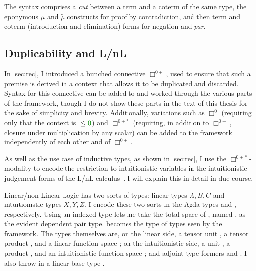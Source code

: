 The syntax comprises a \emph{cut} between a term and a coterm of the same type,
the eponymous $\mu$ and $\tilde\mu$ constructs for proof by contradiction, and
then term and coterm (introduction and elimination) forms for negation and
\emph{par}.




\subsection{Duplicability and L/nL}\label{sec:dup-lnl}
In \cref{sec:rec}, I introduced a bunched connective $\Box^{0{+}}$, used to
ensure that such a premise is derived in a context that allows it to be
duplicated and discarded.
Syntax for this connective can be added to  and worked
through the various parts of the framework, though I do not show these parts in
the text of this thesis for the sake of simplicity and brevity.
Additionally, variations such as $\Box^0$ (requiring only that the context is
${} \leq \gr0$) and $\Box^{0{+}{*}}$ (requiring, in addition to
$\Box^{0{+}}$, closure under multiplication by any scalar) can be added to the
framework independently of each other and of $\Box^{0{+}}$.

As well as the use case of inductive types, as shown in \cref{sec:rec}, I use
the $\Box^{0{+}{*}}$-modality to encode the restriction to intuitionistic
variables in the intuitionistic judgement forms of the L/nL
calculus~\citep{Benton94}.
I will explain this in detail in due course.

Linear/non-Linear Logic has two sorts of types: linear types $A, B, C$ and
intuitionistic types $X, Y, Z$.
I encode these two sorts in the Agda types
\AgdaSpace{} and
\AgdaSpace{}, respectively.
Using an indexed type lets me take the total space of , named
, as the evident dependent pair type.
 becomes the type of types seen by the framework.
The types themselves are, on the linear side,
a tensor unit ,
a tensor product , and
a linear function space ;
on the intuitionistic side,
a unit ,
a product , and
an intuitionistic function space ;
and adjoint type formers  and
.
I also throw in a linear base type \AgdaInductiveConstructor{$\iota$}.

